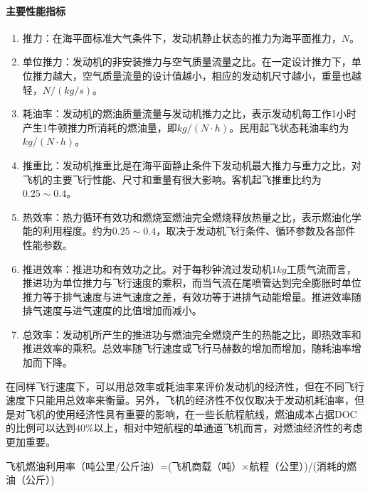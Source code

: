 \documentclass[12pt,a4paper]{report}
\begin{document}
\paragraph{主要性能指标}

\begin{enumerate}
\item 推力：在海平面标准大气条件下，发动机静止状态的推力为海平面推力，$N$。
\item 单位推力：发动机的非安装推力与空气质量流量之比。在一定设计推力下，单位推力越大，空气质量流量的设计值越小，相应的发动机尺寸越小，重量也越轻，$N/(kg/s)$。
\item 耗油率：发动机的燃油质量流量与发动机推力之比，表示发动机每工作1小时产生1牛顿推力所消耗的燃油量，即$kg/(N\cdot h)$。民用起飞状态耗油率约为$kg/(N\cdot h)$。
\item 推重比：发动机推重比是在海平面静止条件下发动机最大推力与重力之比，对飞机的主要飞行性能、尺寸和重量有很大影响。客机起飞推重比约为$0.25\sim0.4$。
\item 热效率：热力循环有效功和燃烧室燃油完全燃烧释放热量之比，表示燃油化学能的利用程度。约为$0.25\sim0.4$，取决于发动机飞行条件、循环参数及各部件性能参数。
\item 推进效率：推进功和有效功之比。对于每秒钟流过发动机$1kg$工质气流而言，推进功为单位推力与飞行速度的乘积，而当气流在尾喷管达到完全膨胀时单位推力等于排气速度与进气速度之差，有效功等于进排气动能增量。推进效率随排气速度与进气速度的比值增加而减小。
\item 总效率：发动机所产生的推进功与燃油完全燃烧产生的热能之比，即热效率和推进效率的乘积。总效率随飞行速度或飞行马赫数的增加而增加，随耗油率增加而下降。
\end{enumerate}

在同样飞行速度下，可以用总效率或耗油率来评价发动机的经济性，但在不同飞行速度下只能用总效率来衡量。另外，飞机的经济性不仅仅取决于发动机耗油率，但是对飞机的使用经济性具有重要的影响，在一些长航程航线，燃油成本占据DOC的比例可以达到$40\%$以上，相对中短航程的单通道飞机而言，对燃油经济性的考虑更加重要。

{\centering
  飞机燃油利用率（吨公里/公斤油）=(飞机商载（吨）×航程（公里）)/(消耗的燃油（公斤）)
}
\end{document}
